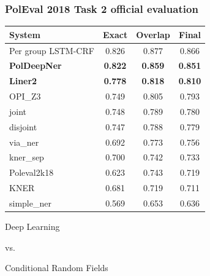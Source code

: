 \documentclass[Warsaw]{beamer}
\begin{document}
\begin{frame}
    \frametitle{PolEval 2018 Task 2 official evaluation}
  \begin{table}[ht]
      \scriptsize
      \centering
      \begin{tabular}{l|c|c|c}
	  \textbf{System}	
	  & \hspace{0.2em} \textbf{Exact} \hspace{0.2em} 
	  & \hspace{0.2em} \textbf{Overlap} \hspace{0.2em} 
	  & \hspace{0.2em} \textbf{Final} \hspace{0.2em}\\
	  \hline
	  \hline
	  Per group LSTM-CRF 	& 0.826	 & 0.877 & 0.866 \\
	  \textbf{PolDeepNer}	& \textbf{0.822} & \textbf{0.859} &	\textbf{0.851} \\
	  \textbf{Liner2}	        & \textbf{0.778} & \textbf{0.818} & \textbf{0.810} \\
	  OPI\_Z3                 & 0.749 & 0.805 & 0.793 \\
	  joint	                & 0.748	& 0.789	& 0.780 \\
	  disjoint	        & 0.747	& 0.788	& 0.779 \\
	  via\_ner	        & 0.692	& 0.773	& 0.756 \\
	  kner\_sep	        & 0.700	& 0.742	& 0.733 \\
	  Poleval2k18	        & 0.623	& 0.743	& 0.719 \\
	  KNER	 	        & 0.681	& 0.719	& 0.711 \\
	  simple\_ner	        & 0.569	& 0.653	& 0.636 \\
      \end{tabular}
      \label{tab:poleval-task2-results}
  \end{table}    
\end{frame}



\begin{frame}
    \begin{center}
        \Huge
        Deep Learning
        
        \normalsize
        vs.
        
        \Huge
        Conditional Random Fields
        
    \end{center}
\end{frame}
\end{document}
